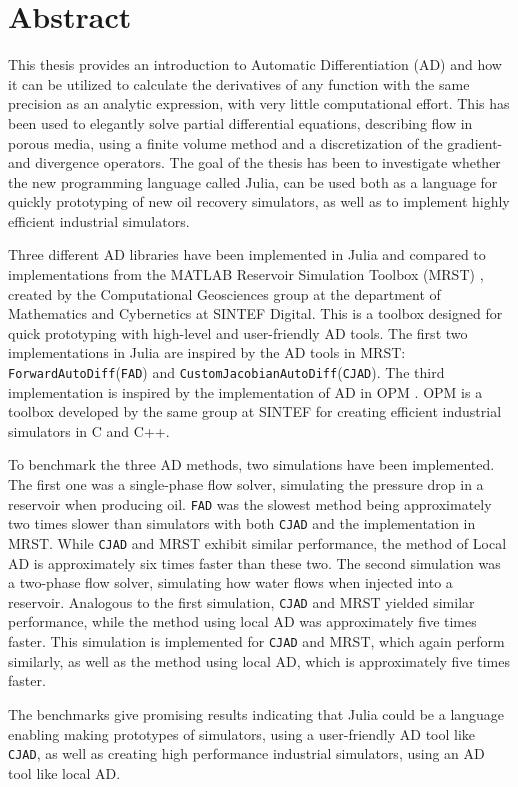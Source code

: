 \chapter*{Abstract}
This thesis provides an introduction to Automatic Differentiation (AD) and how it can be utilized to calculate the derivatives of any function with the same precision as an analytic expression, with very little computational effort. This has been used to elegantly solve partial differential equations, describing flow in porous media, using a finite volume method and a discretization of the gradient- and divergence operators. The goal of the thesis has been to investigate whether the new programming language called Julia, can be used both as a language for quickly prototyping of new oil recovery simulators, as well as to implement highly efficient industrial simulators.

Three different AD libraries have been implemented in Julia and compared to implementations from the MATLAB Reservoir Simulation Toolbox (MRST) \emph{\citep{mrstHomepage}}, created by the Computational Geosciences  group  at  the  department  of  Mathematics  and  Cybernetics  at  SINTEF Digital. This is a toolbox designed for quick prototyping with high-level and user-friendly AD tools. The first two implementations in Julia are inspired by the AD tools in MRST: \texttt{ForwardAutoDiff}(\texttt{FAD}) and \texttt{CustomJacobianAutoDiff}(\texttt{CJAD}). The third implementation is inspired by the implementation of AD in OPM \emph{\citep{opm}}. OPM is a toolbox developed by the same group at SINTEF for creating efficient industrial simulators in C and C++. 

To benchmark the three AD methods, two simulations have been implemented. The first one was a single-phase flow solver, simulating the pressure drop in a reservoir when producing oil. \texttt{FAD} was the slowest method being approximately two times slower than simulators with both \texttt{CJAD} and the implementation in MRST. While \texttt{CJAD} and MRST exhibit similar performance, the method of Local AD is approximately six times faster than these two. The second simulation was a two-phase flow solver, simulating how water flows when injected into a reservoir. Analogous to the first simulation, \texttt{CJAD} and MRST yielded similar performance, while the method using local AD was approximately five times faster.
This simulation is implemented for \texttt{CJAD} and MRST, which again perform similarly, as well as the method using local AD, which is approximately five times faster.

The benchmarks give promising results indicating that Julia could be a language enabling making prototypes of simulators, using a user-friendly AD tool like \texttt{CJAD}, as well as creating high performance industrial simulators, using an AD tool like local AD.